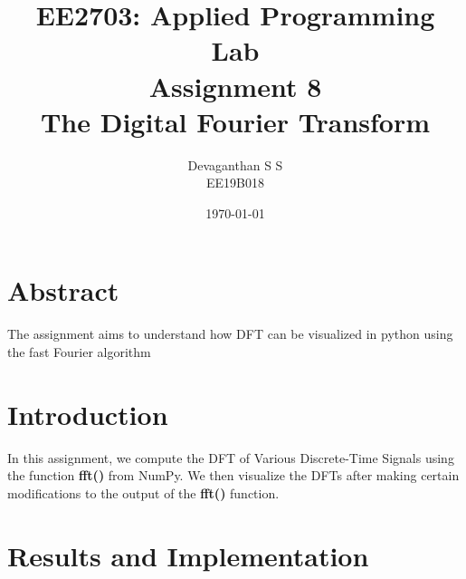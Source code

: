 \documentclass[12pt, a4paper]{report}
\title{\textbf{EE2703: Applied Programming Lab\\Assignment 8\\The Digital Fourier Transform
}}
\author{Devaganthan S S\\ EE19B018}
\date{\today}
\begin{document}
\maketitle


\section{Abstract}
The assignment aims to understand how DFT can be visualized in python using the fast Fourier algorithm

\section{Introduction}
In this assignment, we compute the DFT of Various Discrete-Time Signals using the function \textbf{fft()} from NumPy. We then visualize the DFTs after making certain modifications to the output of the \textbf{fft()} function. 
\section{Results and Implementation}
\end{document}
